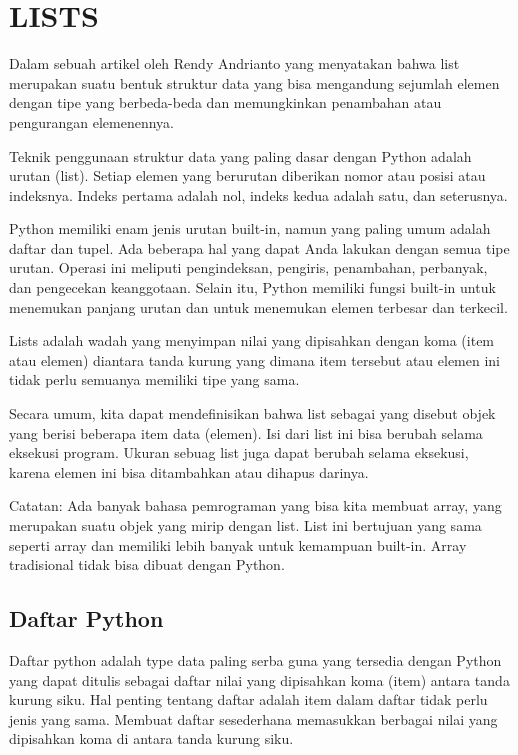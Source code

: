  
\section{LISTS}

Dalam sebuah artikel oleh Rendy Andrianto yang menyatakan bahwa list merupakan suatu bentuk struktur data yang bisa mengandung sejumlah elemen dengan tipe 
yang berbeda-beda dan memungkinkan penambahan atau pengurangan  elemenennya. \cite{andrianto2011aplikasi}

Teknik penggunaan struktur data yang paling dasar dengan Python adalah urutan (list). Setiap elemen yang berurutan diberikan nomor atau posisi atau indeksnya. 
Indeks pertama adalah nol, indeks kedua adalah satu, dan seterusnya.

Python memiliki enam jenis urutan built-in, namun yang paling umum adalah daftar dan tupel. Ada beberapa hal yang dapat Anda lakukan dengan semua tipe urutan.
Operasi ini meliputi pengindeksan, pengiris, penambahan, perbanyak, dan pengecekan keanggotaan. Selain itu, Python memiliki fungsi built-in untuk menemukan 
panjang urutan dan untuk menemukan elemen terbesar dan terkecil. 

Lists adalah wadah yang menyimpan nilai yang dipisahkan dengan  koma (item atau elemen) diantara tanda kurung yang dimana item tersebut atau elemen ini tidak perlu semuanya memiliki tipe yang sama.

Secara umum, kita dapat mendefinisikan bahwa list sebagai yang disebut objek yang berisi beberapa item data (elemen). 
Isi dari list ini bisa berubah selama eksekusi program. 
Ukuran sebuag list juga dapat berubah selama eksekusi, karena elemen ini bisa ditambahkan atau dihapus darinya.

Catatan: Ada banyak bahasa pemrograman yang bisa kita membuat array, yang merupakan suatu objek yang mirip dengan list. 
List ini bertujuan yang sama seperti array dan memiliki lebih banyak untuk kemampuan built-in. 
Array tradisional tidak bisa dibuat dengan Python.

\subsection{Daftar Python} 

Daftar python adalah type data paling serba guna yang tersedia dengan Python yang dapat ditulis sebagai daftar nilai yang dipisahkan koma (item) antara tanda 
kurung siku. Hal penting tentang daftar adalah item dalam daftar tidak perlu jenis yang sama. Membuat daftar sesederhana memasukkan berbagai nilai yang 
dipisahkan koma di antara tanda kurung siku. 

